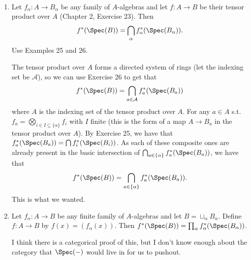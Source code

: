 \begin{questions}
\question
~
\begin{enumerate}
\item Let $f_ \alpha: A \to B_ \alpha $ be any family of $A $-algebras and let $f: A\to B $ be their tensor product over $A $ (Chapter 2, Exercise 23). Then
\[
	f^\ast(\Spec(B)) = \bigcap_{\alpha} f^\ast_{\alpha} (\Spec(B_{\alpha}))
.\] 
\ifhint
	Use Examples 25 and 26.
\fi
\begin{solution}
	The tensor product over $A $ forms a directed system of rings (let the indexing set be $\mathcal{A}$), so we can use Exercise 26 to get that
	\[
		f^\ast(\Spec(B)) = \bigcap_{a \in \mathcal{A}} f^\ast_{a}(\Spec(B_{a}))
	\] 
	where $A $ is the indexing set of the tensor product over $A $.
	For any $a\in A $ s.t. $f_a = \bigotimes_{i \in I \subseteq \{\alpha\}} f_i$ with $I $ finite (this is the form of a map $A \to B_a $ in the tensor product over $A $).
	By Exercise 25, we have that $f_a^\ast(\Spec(B_a)) = \bigcap f_i^\ast(\Spec(B_i))$.
	As each of these composite ones are already present in the basic intersection of $\bigcap_{a \in \{\alpha\} } f^\ast_a(\Spec(B_a))$, we have that
	\[
		f^\ast(\Spec(B)) = \bigcap_{a \in \{\alpha\}  } f^\ast_{a}(\Spec(B_{a}))
	.\] 
	This is what we wanted.
\end{solution}
\item Let $f_ \alpha: A\to B $ be any finite family of $A $-algebras and let $B = \sqcup_ \alpha B_ \alpha $. Define $f: A\to B $ by $f(x) = (f_ \alpha(x)) $. Then $f^\ast(\Spec(B)) = \prod_ \alpha f_ \alpha^\ast (\Spec(B_ \alpha)) $.
\begin{solution}
	I think there is a categorical proof of this, but I don't know enough about the category that $\Spec(-) $ would live in for us to pushout.


\end{solution}
\end{enumerate}
\end{questions}
